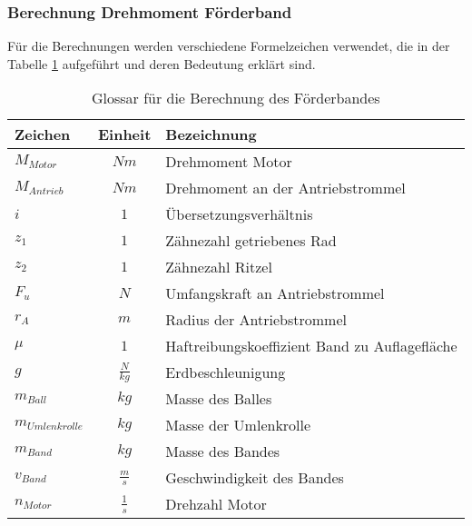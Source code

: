 \subsubsection{Berechnung Drehmoment Förderband}
Für die Berechnungen werden verschiedene Formelzeichen verwendet, die in 
der Tabelle \ref{tab:glossarFoerderband} aufgeführt und deren Bedeutung erklärt sind.
\begin{table}[h!]
    \begin{tabular}{lcl}
    \rule{0pt}{11pt}Zeichen & Einheit & Bezeichnung \\
    \hline\rule{0pt}{11pt} $M_{Motor}$ & $Nm$ & Drehmoment Motor \\
    \rule{0pt}{11pt}$M_{Antrieb}$ & $Nm$ & Drehmoment an der Antriebstrommel \\
    \rule{0pt}{11pt}$i$ & $1$ & Übersetzungsverhältnis \\
	\rule{0pt}{11pt}$z_1$ & $1$ & Zähnezahl getriebenes Rad \\
	\rule{0pt}{11pt}$z_2$ & $1$ & Zähnezahl Ritzel \\
	\rule{0pt}{11pt}$F_u$ & $N$ & Umfangskraft an Antriebstrommel \\
	\rule{0pt}{11pt}$r_A$ & $m$ & Radius der Antriebstrommel \\
	\rule{0pt}{11pt}$\mu$ & $1$ & Haftreibungskoeffizient Band zu Auflagefläche \\
	\rule{0pt}{11pt}$g$ & $\frac{N}{kg}$ & Erdbeschleunigung \\
	\rule{0pt}{11pt}$m_{Ball}$ & $kg$ & Masse des Balles \\
	\rule{0pt}{11pt}$m_{Umlenkrolle}$ & $kg$ & Masse der Umlenkrolle \\
	\rule{0pt}{11pt}$m_{Band}$ & $kg$ & Masse des Bandes \\
	\rule{0pt}{11pt}$v_{Band}$ & $\frac{m}{s}$ & Geschwindigkeit des Bandes \\
	\rule{0pt}{11pt}$n_{Motor}$ & $\frac{1}{s}$ & Drehzahl Motor \\
    \end{tabular}
	\centering
	\caption{Glossar für die Berechnung des Förderbandes}
	\label{tab:glossarFoerderband}
\end{table}

